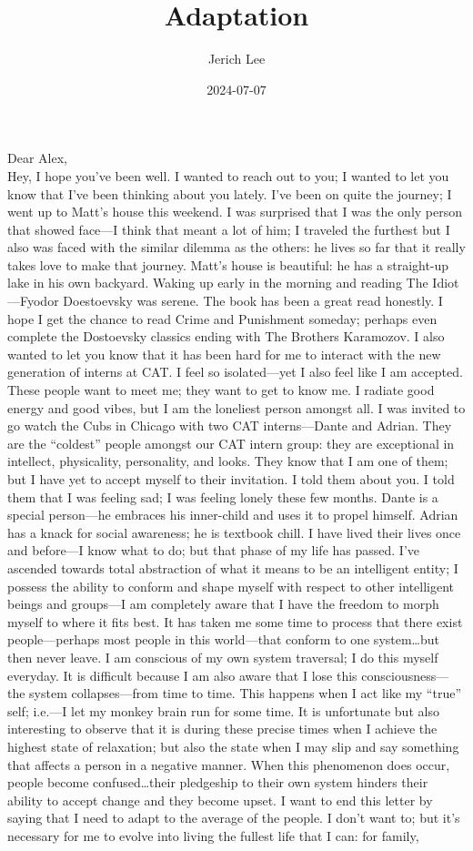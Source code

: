\documentclass[12pt]{article}
\title{Adaptation}
\author{Jerich Lee}
\date{2024-07-07}
\theoremstyle{definition} %
\theoremstyle{plain} %
\begin{document}
\maketitle
\noindent
Dear Alex, 
\vspace{.5cm} 
\\
Hey, I hope you’ve been well. I wanted to reach out to you; I wanted to let you know that I’ve been thinking about you lately. I’ve been on quite the journey; I went up to Matt’s house this weekend. I was surprised that I was the only person that showed face—I think that meant a lot of him; I traveled the furthest but I also was faced with the similar dilemma as the others: he lives so far that it really takes love to make that journey. Matt’s house is beautiful: he has a straight-up lake in his own backyard. Waking up early in the morning and reading The Idiot—Fyodor Doestoevsky was serene. The book has been a great read honestly. I hope I get the chance to read Crime and Punishment someday; perhaps even complete the Dostoevsky classics ending with The Brothers Karamozov. I also wanted to let you know that it has been hard for me to interact with the new generation of interns at CAT. I feel so isolated—yet I also feel like I am accepted. These people want to meet me; they want to get to know me. I radiate good energy and good vibes, but I am the loneliest person amongst all. I was invited to go watch the Cubs in Chicago with two CAT interns—Dante and Adrian. They are the “coldest” people amongst our CAT intern group: they are exceptional in intellect, physicality, personality, and looks. They know that I am one of them; but I have yet to accept myself to their invitation. I told them about you. I told them that I was feeling sad; I was feeling lonely these few months. Dante is a special person—he embraces his inner-child and uses it to propel himself. Adrian has a knack for social awareness; he is textbook chill. I have lived their lives once and before—I know what to do; but that phase of my life has passed. I’ve ascended towards total abstraction of what it means to be an intelligent entity; I possess the ability to conform and shape myself with respect to other intelligent beings and groups—I am completely aware that I have the freedom to morph myself to where it fits best. It has taken me some time to process that there exist people—perhaps most people in this world—that conform to one system…but then never leave. I am conscious of my own system traversal; I do this myself everyday. It is difficult because I am also aware that I lose this consciousness—the system collapses—from time to time. This happens when I act like my “true” self; i.e.—I let my monkey brain run for some time. It is unfortunate but also interesting to observe that it is during these precise times when I achieve the highest state of relaxation; but also the state when I may slip and say something that affects a person in a negative manner. When this phenomenon does occur, people become confused…their pledgeship to their own system hinders their ability to accept change and they become upset. I want to end this letter by saying that I need to adapt to the average of the people. I don’t want to; but it’s necessary for me to evolve into living the fullest life that I can: for family, 
\end{document}
